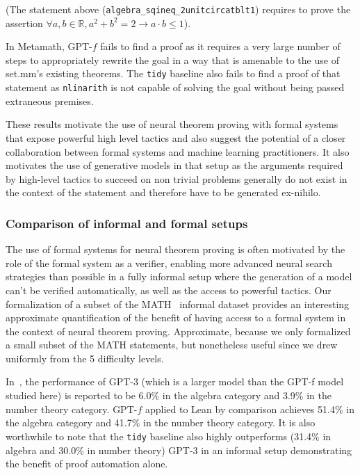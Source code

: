 (The statement above (\verb+algebra_sqineq_2unitcircatblt1+) requires to prove the assertion $\forall a, b \in \mathbb{R}, a^2 + b^2 = 2 \rightarrow a \cdot b \leq 1$).

In Metamath, GPT-$f$ fails to find a proof as it requires a very large number of steps to appropriately rewrite the goal in a way that is amenable to the use of set.mm's existing theorems. The \texttt{tidy} baseline also fails to find a proof of that statement as \verb_nlinarith_ is not capable of solving the goal without being passed extraneous premises.

These results motivate the use of neural theorem proving with formal systems that expose powerful high level tactics and also suggest the potential of a closer collaboration between formal systems and machine learning practitioners. It also motivates the use of generative models in that setup as the arguments required by high-level tactics to succeed on non trivial problems generally do not exist in the context of the statement and therefore have to be generated ex-nihilo.

\subsubsection{Comparison of informal and formal setups} The use of formal systems for neural theorem proving is often motivated by the role of the formal system as a verifier, enabling more advanced neural search strategies than possible in a fully informal setup where the generation of a model can't be verified automatically, as well as the access to powerful tactics. Our formalization of a subset of the MATH~\citep{hendrycks2021measuring} informal dataset provides an interesting approximate quantification of the benefit of having access to a formal system in the context of neural theorem proving. Approximate, because we only formalized a small subset of the MATH statements, but nonetheless useful since we drew uniformly from the 5 difficulty levels.

In~\citet{hendrycks2021measuring}, the performance of GPT-3 (which is a larger model than the GPT-f model studied here) is reported to be 6.0\% in the algebra category and 3.9\% in the number theory category. GPT-$f$ applied to Lean by comparison achieves 51.4\% in the algebra category and 41.7\% in the number theory category. It is also worthwhile to note that the \texttt{tidy} baseline also highly outperforms (31.4\% in algebra and 30.0\% in number theory) GPT-3 in an informal setup demonstrating the benefit of proof automation alone.

